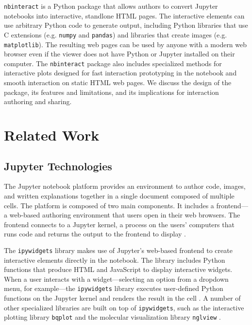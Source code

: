 \documentclass[nobib]{tufte-handout}
\newcommand{\code}[1]{\texttt{#1}}
\begin{document}
\code{nbinteract} is a Python package that allows authors to convert Jupyter
notebooks into interactive, standlone HTML pages. The interactive elements can
use arbitrary Python code to generate output, including Python libraries that
use C extensions (e.g. \code{numpy} and \code{pandas}) and libraries that
create images (e.g. \code{matplotlib}). The resulting web pages can be used by
anyone with a modern web browser even if the viewer does not have Python or
Jupyter installed on their computer. The \code{nbinteract} package also
includes specialized methods for interactive plots designed for fast
interaction prototyping in the notebook and smooth interaction on static HTML
web pages. We discuss the design of the package, its features and limitations,
and its implications for interaction authoring and sharing.


\section{Related Work} %
\label{sec:related_work}

\subsection{Jupyter Technologies} %
\label{sub:jupyter_technologies}

The Jupyter notebook platform provides an environment to author code, images,
and written explanations together in a single document composed of multiple
cells. The platform is composed of two main components. It includes a
frontend---a web-based authoring environment that users open in their web
browsers. The frontend connects to a Jupyter kernel, a process on the users'
computers that runs code and returns the output to the frontend to display
\cite{thomas_jupyter_2016}.

The \code{ipywidgets} library makes use of Jupyter's web-based frontend to
create interactive elements directly in the notebook. The library includes
Python functions that produce HTML and JavaScript to display interactive
widgets. When a user interacts with a widget---selecting an option from a
dropdown menu, for example---the \code{ipywidgets} library executes
user-defined Python functions on the Jupyter kernel and renders the result in
the cell \cite{_jupyter-widgets/ipywidgets_}. A number of other specialized
libraries are built on top of \code{ipywidgets}, such as the interactive
plotting library \code{bqplot} \cite{_bqplot_2018} and the molecular
visualization library \code{nglview} \cite{_arose/nglview_}.
\end{document}
